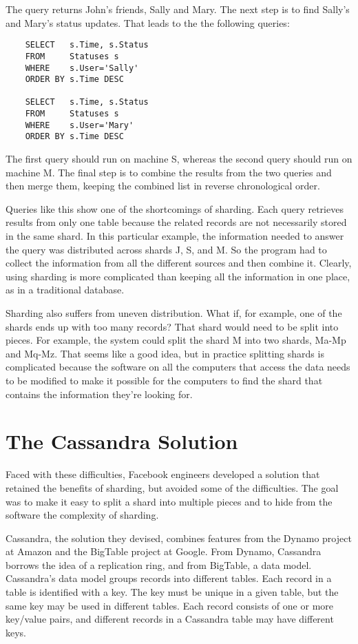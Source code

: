 The query returns John's friends, Sally and Mary.
The next step is to find Sally's and Mary's status updates.
That leads to the the following queries:
\begin{code}
\begin{verbatim}
	SELECT   s.Time, s.Status
	FROM     Statuses s
	WHERE    s.User='Sally'
	ORDER BY s.Time DESC

	SELECT   s.Time, s.Status
	FROM     Statuses s
	WHERE    s.User='Mary'
	ORDER BY s.Time DESC
\end{verbatim}
\end{code}

The first query should run on machine S,
whereas the second query should run on machine M.
The final step is to combine the results from the two queries
and then merge them, keeping
the combined list in reverse chronological order.

Queries like this show one of the shortcomings of sharding.
Each query retrieves results from only one table
because the related records
are not necessarily stored in the same shard.
In this particular example, the information needed to answer the query was
distributed across shards J, S, and M.
So the program had to collect the information
from all the different sources and then combine it.
Clearly, using sharding is more complicated
than keeping all the information in one place,
as in a traditional database.

Sharding also suffers from uneven distribution.
What if, for example, one of the shards ends up with too many records?
That shard would need to be split into pieces.
For example, the system could
split the shard M into two shards, Ma-Mp and Mq-Mz.
That seems like a good idea, but in practice splitting shards
is complicated because the software on all the computers that access the data
needs to be modified to make it possible for the computers
to find the shard that contains the information they're looking for.

\section{The Cassandra Solution}

Faced with these difficulties, Facebook engineers developed a solution that
retained the benefits of sharding, but avoided some of the difficulties.
The goal was to make it easy to split a shard into multiple pieces
and to hide from the software the complexity of sharding.

Cassandra, the solution they devised, combines features
from the Dynamo project at Amazon and the BigTable project at Google.
From Dynamo, Cassandra borrows the idea of a replication ring,
and from BigTable, a data model.
Cassandra's data model groups records into different tables.
Each record in a table is identified with a key.
The key must be unique in a given table,
but the same key may be used in different tables.
Each record consists of one or more key/value pairs, and
different records in a Cassandra table may have different keys.

